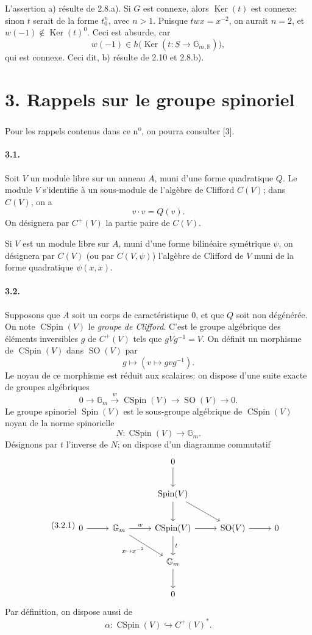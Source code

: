 \documentclass[10pt,leqno]{article}
\newcommand{\R}{\mathbb{R}}
\newcommand{\Gm}{\mathbb{G}_m}
\newcommand{\SO}{\operatorname{SO}}
\newcommand{\Spin}{\operatorname{Spin}}
\newcommand{\CSpin}{\operatorname{CSpin}}
\newcommand{\Ker}{\operatorname{Ker}}
\newcommand{\into}{\hookrightarrow}
\begin{document}
L'assertion a) résulte de 2.8.a). Si $G$ est connexe, alors $\Ker(t)$ est connexe: sinon $t$ serait de la forme $t_0^n$, avec $n>1$. Puisque $twx=x^{-2}$, on aurait $n=2$, et $w(-1)\notin\Ker(t)^0$. Ceci est absurde, car
\[
w(-1)\in h\bigl(\Ker(t:\underline S\longrightarrow\mathbb G_{m,\R})\bigr),
\]
qui est connexe. Ceci dit, b) résulte de 2.10 et 2.8.b).

\section*{3. Rappels sur le groupe spinoriel}

Pour les rappels contenus dans ce n\textsuperscript{o}, on pourra consulter [3].

\paragraph{3.1.} Soit $V$ un module libre sur un anneau $A$, muni d'une forme quadratique $Q$. Le module $V$ s'identifie à un sous-module de l'algèbre de Clifford $C(V)$; dans $C(V)$, on a
\[
v\cdot v=Q(v).
\]
On désignera par $C^+(V)$ la partie paire de $C(V)$.

\clearpage

Si $V$ est un module libre sur $A$, muni d'une forme bilinéaire symétrique $\psi$, on désignera par $C(V)$ (ou par $C(V,\psi)$) l'algèbre de Clifford de $V$ muni de la forme quadratique $\psi(x,x)$.

\paragraph{3.2.} Supposons que $A$ soit un corps de caractéristique $0$, et que $Q$ soit non dégénérée. On note $\CSpin(V)$ le \emph{groupe de Clifford}. C'est le groupe algébrique des éléments inversibles $g$ de $C^+(V)$ tels que $gVg^{-1}=V$. On définit un morphisme de $\CSpin(V)$ dans $\SO(V)$ par
\[
g\longmapsto (v\longmapsto gvg^{-1}).
\]
Le noyau de ce morphisme est réduit aux scalaires: on dispose d'une suite exacte de groupes algébriques
\[
0\longrightarrow\Gm\xrightarrow{\ w\ }\CSpin(V)\longrightarrow\SO(V)\longrightarrow0.
\]
Le groupe spinoriel $\Spin(V)$ est le sous-groupe algébrique de $\CSpin(V)$ noyau de la norme spinorielle
\[
N:\CSpin(V)\longrightarrow\Gm.
\]
Désignons par $t$ l'inverse de $N$; on dispose d'un diagramme commutatif
\[
\tag{3.2.1}
\begin{tikzcd}[column sep=2.6em,row sep=2.3em]
& & 0 \arrow[d] & & \\
& & \Spin(V) \arrow[d] \arrow[dr] & & \\
0 \arrow[r] & \Gm \arrow[r,"w"] \arrow[dr,"x\mapsto x^{-2}"'] & \CSpin(V) \arrow[r] \arrow[d,"t"] & \SO(V) \arrow[r] & 0\\
& & \Gm \arrow[d] & & \\
& & 0 & &
\end{tikzcd}
\]
Par définition, on dispose aussi de
\[
\tag{3.2.2}
\alpha:\CSpin(V)\into C^+(V)^*.
\]
\end{document}
